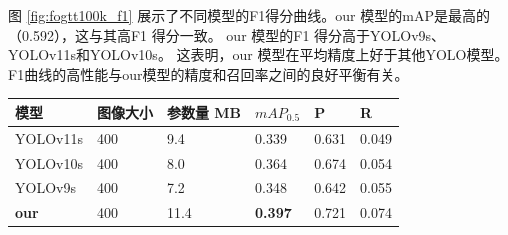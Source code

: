 图 \ref{fig:fogtt100k_f1} 展示了不同模型的F1得分曲线。our 模型的mAP是最高的（0.592），这与其高F1 得分一致。 our 模型的F1 得分高于YOLOv9s、YOLOv11s和YOLOv10s。 这表明，our 模型在平均精度上好于其他YOLO模型。 F1曲线的高性能与our模型的精度和召回率之间的良好平衡有关。 



\begin{table}[H]
    \centering
    \captionsetup{font=footnotesize}
    \label{tab:compare_studies_fogvd}
    \begin{tabular}{p{}p{}p{}p{}p{}p{}}
        \toprule
        模型         & 图像大小 & 参数量 MB & $mAP_{0.5}$     & P     & R     \\  
        \midrule
        YOLOv11s     & 400     & 9.4   & 0.339           & 0.631  & 0.049 \\
        YOLOv10s     & 400     & 8.0   & 0.364           & 0.674  & 0.054 \\
        YOLOv9s      & 400     & 7.2   & 0.348           & 0.642  & 0.055 \\
        \textbf{our} & 400     & 11.4  & \textbf{0.397}  & 0.721  & 0.074 \\
        \bottomrule
    \end{tabular}
\end{table}

